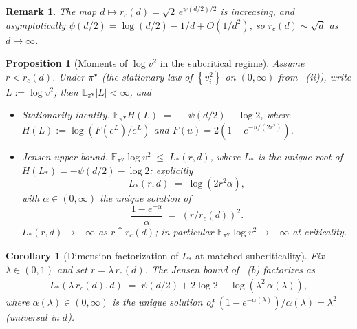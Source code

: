 \documentclass{article}
\newcommand{\Set}[1]{\left\{ #1 \right\}}
\newcommand{\Brack}[1]{\left( #1 \right)}
\newcommand{\Expsubidx}[2]{\mathbb{E}_{#1} #2}
\newtheorem{corollary}[theorem]{Corollary}
\newtheorem{remark}[theorem]{Remark}
\newtheorem{proposition}[theorem]{Proposition}
\newcommand{\bv}{\mathbf{v}}
\begin{document}
\begin{remark}
  \label{rem:sync_d_scaling}
  The map $d \mapsto r_c(d) = \sqrt 2\, e^{\psi(d/2)/2}$ is increasing, and asymptotically $\psi(d/2) = \log(d/2) - 1/d + O(1/d^2)$, so $r_c(d) \sim \sqrt d$ as $d \to \infty$.
\end{remark}

\begin{proposition}[Moments of $\log v^2$ in the subcritical regime]
  \label{cor:sync_log_stationary}
  Assume $r < r_c(d)$. Under $\pi^{\bv}$ (the stationary law of $\Set{v_i^2}$ on $(0, \infty)$ from ~(ii)), write $L := \log v^2$; then $\Expsubidx{\pi^{\bv}}{|L|} < \infty$, and
  \begin{itemize}
    \item[(a)] \emph{Stationarity identity.} $\Expsubidx{\pi^{\bv}}{H(L)} \;=\; -\psi(d/2) - \log 2$, where $H(L) := \log\Brack{F(e^L)/e^L}$ and $F(u) = 2(1 - e^{-u/(2r^2)})$.
    \item[(b)] \emph{Jensen upper bound.} $\Expsubidx{\pi^{\bv}}{\log v^2} \;\le\; L_*(r, d)$, where $L_*$ is the unique root of $H(L_*) = -\psi(d/2) - \log 2$; explicitly
    \begin{equation}
      \label{eq:sync_L_star}
      L_*(r, d) \;=\; \log\Brack{2 r^2 \alpha},
    \end{equation}
    with $\alpha \in (0,\infty)$ the unique solution of
    \begin{equation*}
      \frac{1 - e^{-\alpha}}{\alpha} \;=\; \Brack{r / r_c(d)}^2.
    \end{equation*}
    $L_*(r, d) \to -\infty$ as $r \uparrow r_c(d)$; in particular $\Expsubidx{\pi^{\bv}}{\log v^2} \to -\infty$ at criticality.
  \end{itemize}
\end{proposition}

\begin{corollary}[Dimension factorization of $L_*$ at matched subcriticality]
  \label{cor:sync_subcrit_d_scaling}
  Fix $\lambda \in (0, 1)$ and set $r = \lambda\, r_c(d)$. The Jensen bound of ~(b) factorizes as
  \begin{eqnarray*}
    L_*(\lambda\,r_c(d), d) \;=\; \psi(d/2) + 2\log 2 + \log\Brack{\lambda^2\,\alpha(\lambda)},
  \end{eqnarray*}
  where $\alpha(\lambda) \in (0, \infty)$ is the unique solution of $(1 - e^{-\alpha(\lambda)})/\alpha(\lambda) = \lambda^2$ (universal in $d$).
\end{corollary}
\end{document}
